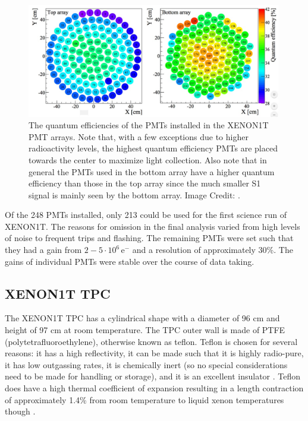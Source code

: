 \begin{figure}[t]
	\centering
	\includegraphics[width=0.99\textwidth]{xe1t_pmt_qe}
	\caption{The quantum efficiencies of the PMTs installed in the XENON1T PMT arrays.  Note that, with a few exceptions due to higher radioactivity levels, the highest quantum efficiency PMTs are placed towards the center to maximize light collection.  Also note that in general the PMTs used in the bottom array have a higher quantum efficiency than those in the top array since the much smaller S1 signal is mainly seen by the bottom array.  Image Credit: .}
	\label{fig:xe1t_pmt_qe}
\end{figure}
 
 Of the 248 PMTs installed, only 213 could be used for the first science run of XENON1T.  The reasons for omission in the final analysis varied from high levels of noise to frequent trips and flashing.  The remaining PMTs were set such that they had a gain from $2- 5 \cdot 10^6 \, \textrm{e}^-$ and a resolution of approximately 30\%.  The gains of individual PMTs were stable over the course of data taking.
 
 
  \subsection{XENON1T TPC}
 \label{sec:xe1t_tpc}

The XENON1T TPC has a cylindrical shape with a diameter of 96 cm and height of 97 cm at room temperature.  The TPC outer wall is made of PTFE (polytetrafluoroethylene), otherwise known as teflon.  Teflon is chosen for several reasons: it has a high reflectivity, it can be made such that it is highly radio-pure, it has low outgassing rates, it is chemically inert (so no special considerations need to be made for handling or storage), and it is an excellent insulator \cite{neves2017measurement}.  Teflon does have a high thermal coefficient of expansion resulting in a length contraction of approximately 1.4\% from room temperature to liquid xenon temperatures though \cite{kirby1956thermal}.

